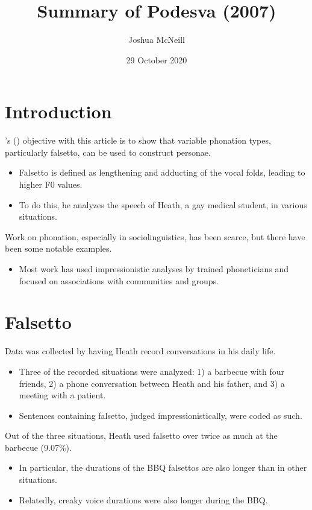 \documentclass{article}
\title{Summary of Podesva (2007)}
\author{Joshua McNeill}
\date{29 October 2020}
\begin{document}
  \maketitle
  \section{Introduction}
    \noindent{}\citeauthor{podesva_phonation_2007}'s (\citeyear{podesva_phonation_2007}) objective with this article is to show that variable phonation types, particularly falsetto, can be used to construct personae.
    \begin{itemize}
      \item Falsetto is defined as lengthening and adducting of the vocal folds, leading to higher F0 values.
      \item To do this, he analyzes the speech of Heath, a gay medical student, in various situations.
    \end{itemize}
    Work on phonation, especially in sociolinguistics, has been scarce, but there have been some notable examples.
    \begin{itemize}
      \item Most work has used impressionistic analyses by trained phoneticians and focused on associations with communities and groups.
    \end{itemize}
  \section{Falsetto}
    \noindent{}Data was collected by having Heath record conversations in his daily life.
    \begin{itemize}
      \item Three of the recorded situations were analyzed: 1) a barbecue with four friends, 2) a phone conversation between Heath and his father, and 3) a meeting with a patient.
      \item Sentences containing falsetto, judged impressionistically, were coded as such.
    \end{itemize}
    Out of the three situations, Heath used falsetto over twice as much at the barbecue (9.07\%).
    \begin{itemize}
      \item In particular, the durations of the BBQ falsettos are also longer than in other situations.
      \item Relatedly, creaky voice durations were also longer during the BBQ.
    \end{itemize}
\end{document}
